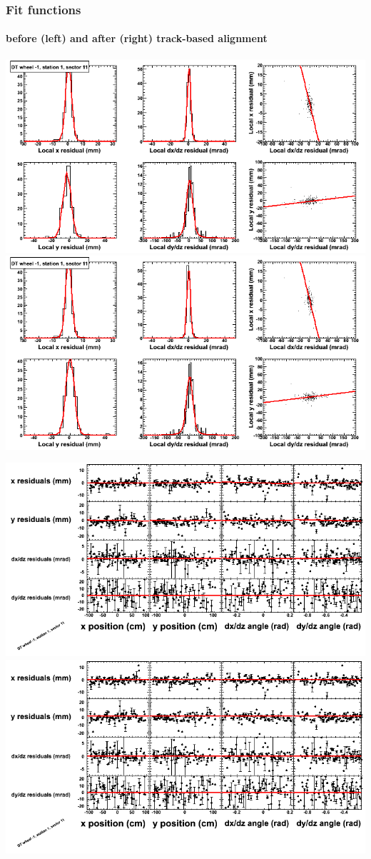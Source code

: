 \documentclass[compress]{beamer}
\begin{document}
\begin{frame}
\frametitle{Fit functions}
\framesubtitle{before (left) and after (right) track-based alignment}
\includegraphics[width=0.5\linewidth]{fitfunctions_re01/MBwhBst1sec11_bellcurves.png} \includegraphics[width=0.5\linewidth]{fitfunctions_re05/MBwhBst1sec11_bellcurves.png}

\includegraphics[width=0.5\linewidth]{fitfunctions_re01/MBwhBst1sec11_polynomials.png} \includegraphics[width=0.5\linewidth]{fitfunctions_re05/MBwhBst1sec11_polynomials.png}
\end{frame}
\end{document}
